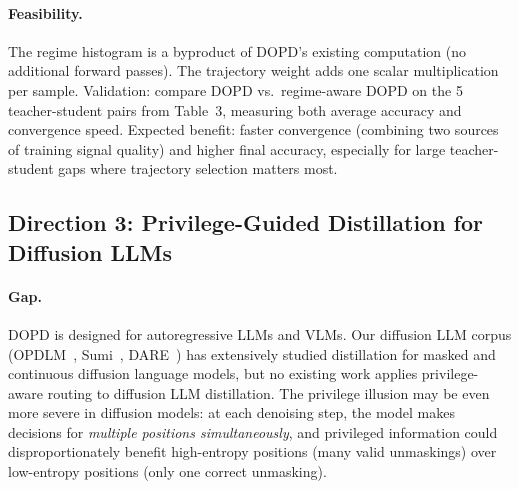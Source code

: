 \documentclass[11pt,a4paper]{article}
\begin{document}
\paragraph{Feasibility.} The regime histogram is a byproduct of DOPD's existing computation (no additional forward passes). The trajectory weight adds one scalar multiplication per sample. Validation: compare DOPD vs.\ regime-aware DOPD on the 5 teacher-student pairs from Table~3, measuring both average accuracy and convergence speed. Expected benefit: faster convergence (combining two sources of training signal quality) and higher final accuracy, especially for large teacher-student gaps where trajectory selection matters most.

\subsection{Direction 3: Privilege-Guided Distillation for Diffusion LLMs}

\paragraph{Gap.} DOPD is designed for autoregressive LLMs and VLMs. Our diffusion LLM corpus (OPDLM~\cite{ye2026opdlm}, Sumi~\cite{chen2026sumi}, DARE~\cite{dare2026}) has extensively studied distillation for masked and continuous diffusion language models, but no existing work applies privilege-aware routing to diffusion LLM distillation. The privilege illusion may be even more severe in diffusion models: at each denoising step, the model makes decisions for \emph{multiple positions simultaneously}, and privileged information could disproportionately benefit high-entropy positions (many valid unmaskings) over low-entropy positions (only one correct unmasking).
\end{document}
